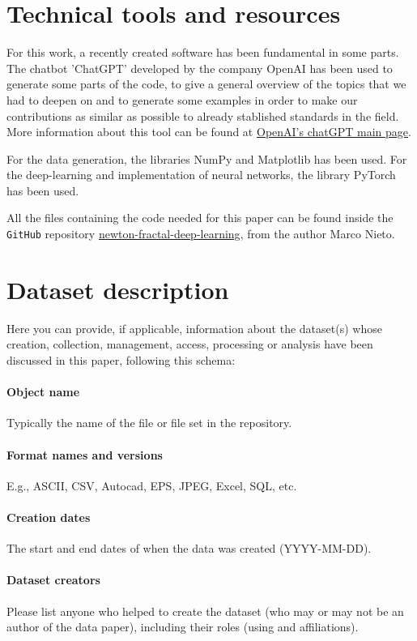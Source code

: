 \documentclass{article}
\begin{document}
\section{Technical tools and resources}
For this work, a recently created software has been fundamental in some parts. The chatbot 'ChatGPT' developed by the company OpenAI has been used to generate some parts of the code, to give a general overview of the topics that we had to deepen on and to generate some examples in order to make our contributions as similar as possible to already stablished standards in the field. More information about this tool can be found at \href{https://openai.com/blog/chatgpt/}{OpenAI's chatGPT main page}.

For the data generation, the libraries NumPy and Matplotlib has been used.
For the deep-learning and implementation of neural networks, the library PyTorch has been used.

All the files containing the code needed for this paper can be found inside the \texttt{GitHub} repository \href{https://github.com/Mnietoprez/newton-fractal-deep-learning}{newton-fractal-deep-learning}, from the author Marco Nieto.

\section{Dataset description}
Here you can provide, if applicable, information about the dataset(s) whose creation, collection, management, access, processing or analysis have been discussed in this paper, following this schema:
\paragraph{Object name} Typically the name of the file or file set in the repository.
\paragraph{Format names and versions} E.g., ASCII, CSV, Autocad, EPS, JPEG, Excel, SQL, etc.
\paragraph{Creation dates} The start and end dates of when the data was created (YYYY-MM-DD).
\paragraph{Dataset creators} Please list anyone who helped to create the dataset (who may or may not be an author of the data paper), including their roles (using and affiliations).
\end{document}
